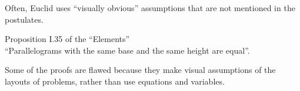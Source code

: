 \documentclass[class=article, crop=false]{standalone}
\begin{document}
  \begin{note}{}
    Often, Euclid uses ``visually obvious'' assumptions that are not mentioned in the postulates.
  \end{note}
  \begin{example}{Proposition I.35 of the ``Elements''} \\
    ``Parallelograms with the same base and the same height are equal''.
  \end{example}
  \begin{note}{}
    Some of the proofs are flawed because they make visual assumptions of the layouts of problems, rather than use equations and variables.
  \end{note}
\end{document}
